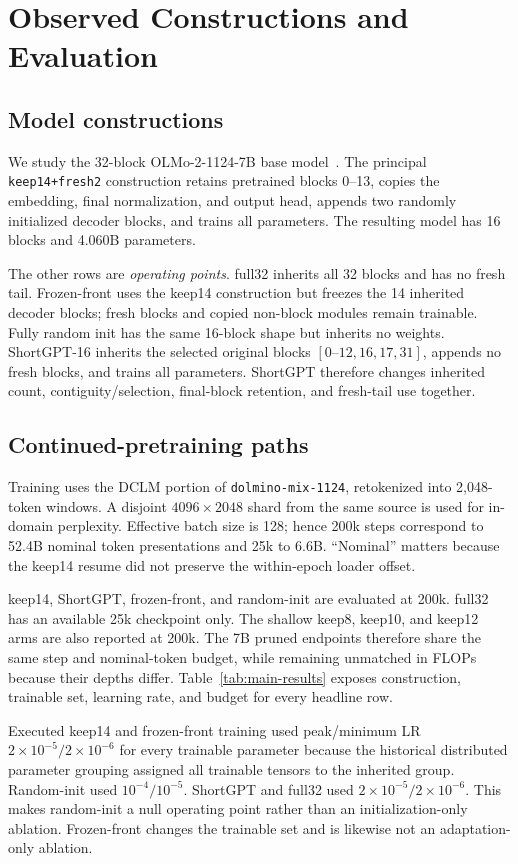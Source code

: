 \section{Observed Constructions and Evaluation}
\label{sec:method}

\subsection{Model constructions}
We study the 32-block OLMo-2-1124-7B base model~\citep{olmo2}. The principal
\texttt{keep14+fresh2} construction retains pretrained blocks 0--13, copies the
embedding, final normalization, and output head, appends two randomly
initialized decoder blocks, and trains all parameters. The resulting model has
16 blocks and 4.060B parameters.

The other rows are \emph{operating points}. full32 inherits all 32 blocks and
has no fresh tail. Frozen-front uses the keep14 construction but freezes the 14
inherited decoder blocks; fresh blocks and copied non-block modules remain
trainable. Fully random init has the same 16-block shape but inherits no
weights. ShortGPT-16 inherits the selected original blocks
$[0\text{--}12,16,17,31]$, appends no fresh blocks, and trains all parameters.
ShortGPT therefore changes inherited count, contiguity/selection, final-block
retention, and fresh-tail use together.

\subsection{Continued-pretraining paths}
Training uses the DCLM portion of \texttt{dolmino-mix-1124}, retokenized into
2,048-token windows. A disjoint $4096\times2048$ shard from the same source is
used for in-domain perplexity. Effective batch size is 128; hence 200k steps
correspond to 52.4B nominal token presentations and 25k to 6.6B. ``Nominal''
matters because the keep14 resume did not preserve the within-epoch loader
offset.

keep14, ShortGPT, frozen-front, and random-init are evaluated at 200k. full32
has an available 25k checkpoint only. The shallow keep8, keep10, and keep12 arms
are also reported at 200k. The 7B pruned endpoints therefore share the same step
and nominal-token budget, while remaining unmatched in FLOPs because their
depths differ. Table~\ref{tab:main-results} exposes construction, trainable set,
learning rate, and budget for every headline row.

Executed keep14 and frozen-front training used peak/minimum LR
$2\times10^{-5}/2\times10^{-6}$ for every trainable parameter because the
historical distributed parameter grouping assigned all trainable tensors to
the inherited group. Random-init used $10^{-4}/10^{-5}$. ShortGPT and full32
used $2\times10^{-5}/2\times10^{-6}$. This makes random-init a null operating
point rather than an initialization-only ablation. Frozen-front changes the
trainable set and is likewise not an adaptation-only ablation.

